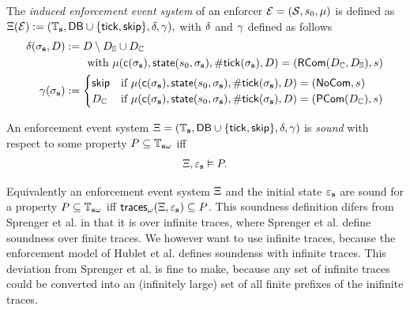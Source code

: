 \begin{definition}
    \label{def:induced-event-system}
    The \emph{induced enforcement event system} of an enforcer
    $\mathcal{E} = (\mathcal{S}, s_0, \mu)$ is defined as
    $ \Xi(\mathcal{E}) :=
    (\mathbb{T}_{\mathbf{s}}, \mathsf{DB} \cup \{\mathsf{tick}, \mathsf{skip} \}, \delta, \gamma), $
    with  $\delta$ and $\gamma$ defined as follows
    \begin{align*}
        \RFun(\sigma_\sys, D)
        &:= D \setminus D_\Sup \cup D_\Cau \\
        &\qquad \text{with }
        \EnfFun(\cConv(\sigma_\sys), \state(s_0, \sigma_\sys), \numTicks(\sigma_\sys), D) =
        (\RCom(D_\Cau, D_\Sup), s) %
        \\
        \PFun(\sigma_\sys) &:=
        \begin{cases}
            \sskip &\text{if }
                \EnfFun(\cConv(\sigma_\sys), \state(s_0, \sigma_\sys), \numTicks(\sigma_\sys), D) =
                (\NCom, s) \\
            D_\Cau &\text{if }
                \EnfFun(\cConv(\sigma_\sys), \state(s_0, \sigma_\sys), \numTicks(\sigma_\sys), D) =
                (\PCom(D_\Cau), s)
        \end{cases}
    \end{align*}
\end{definition}

\begin{definition}
    \label{def:enf-event-system-soundness-property}
    An enforcement event system
    $\Xi =
    \left(\mathbb{T}_{\mathbf{s}}, \mathsf{DB} \cup \{ \mathsf{tick}, \mathsf{skip} \}, \delta, \gamma \right)$
    is \emph{sound} with respect to some
    property $P \subseteq \mathbb{T}_{\mathbf{s} \omega}$ iff
    \begin{equation*}
        \Xi, \varepsilon_{\mathbf{s}} \vDash P.
    \end{equation*}    
\end{definition}
Equivalently an enforcement event system $\Xi$ and
the initial state $\varepsilon_{\mathbf{s}}$
are sound for a property $P \subseteq \mathbb{T}_{\mathbf{s} \omega}$
iff $\mathsf{traces}_\omega(\Xi, \varepsilon_{\mathbf{s}}) \subseteq P$.
This soundness definition difers from
Sprenger et al. \cite{igloo} in that
it is over infinite traces, where Sprenger et al.
define soundness over finite traces.
We however want to use infinite traces, because
the enforcement model of Hublet et al. \cite{whyenf}
defines soundenss with infinite traces.
This deviation from Sprenger et al. \cite{igloo}
is fine to make, because any set
of infinite traces could be converted into an
(infinitely large) set of all finite prefixes of
the inifinite traces.

